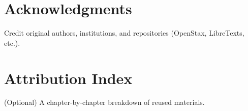 \documentclass[11pt,oneside]{book}
\theoremstyle{definition}
\begin{document}
%
%



\backmatter
\chapter*{Acknowledgments}
Credit original authors, institutions, and repositories (OpenStax, LibreTexts, etc.).



\chapter*{Attribution Index}
(Optional) A chapter-by-chapter breakdown of reused materials.





\end{document}
